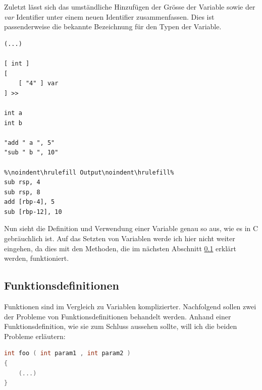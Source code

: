 Zuletzt lässt sich das umständliche Hinzufügen der Grösse der Variable sowie der \textit{var} Identifier unter einem neuen Identifier zusammenfassen. Dies ist passenderweise die bekannte Bezeichnung für den Typen der Variable.

\begin{lstlisting}[language=QHS, caption=Definition einer Variable mit \textit{int} Identifier]
(...)

[ int ] 
[
    [ "4" ] var
] >>
    
int a 
int b 
    
"add " a ", 5"
"sub " b ", 10"
        
%\noindent\hrulefill Output\noindent\hrulefill%
sub rsp, 4
sub rsp, 8
add [rbp-4], 5
sub [rbp-12], 10
\end{lstlisting}

Nun sieht die Definition und Verwendung einer Variable genau so aus, wie es in C gebräuchlich ist.
Auf das Setzten von Variablen werde ich hier nicht weiter eingehen, da dies mit den Methoden, die im nächsten Abschnitt \ref{sec:qhs-funcs} erklärt werden, funktioniert.

\subsection{Funktionsdefinitionen} \label{sec:qhs-funcs}
Funktionen sind im Vergleich zu Variablen komplizierter. Nachfolgend sollen zwei der Probleme von Funktionsdefinitionen behandelt werden.
Anhand einer Funktionsdefinition, wie sie zum Schluss aussehen sollte, will ich die beiden Probleme erläutern:

\begin{lstlisting}[language=C, label=eg:qhs-function_goal, caption=Ziel für die Definition einer Funktion in QHS]
int foo ( int param1 , int param2 )
{
    (...)
}
\end{lstlisting}

